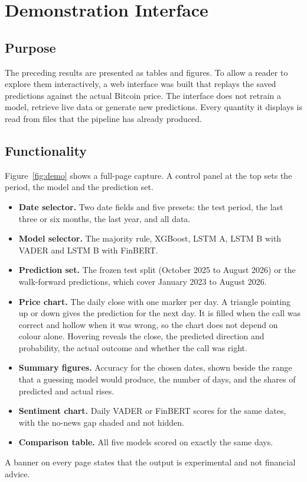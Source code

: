\section{Demonstration Interface}
\label{ch:demo}
\subsection{Purpose}
The preceding results are presented as tables and figures. To allow a reader to explore them interactively, a web interface was built that replays the saved predictions against the actual Bitcoin price. The interface does not retrain a model, retrieve live data or generate new predictions. Every quantity it displays is read from files that the pipeline has already produced.

\subsection{Functionality}
Figure~\ref{fig:demo} shows a full-page capture. A control panel at the top sets the period, the model and the prediction set.
\begin{itemize}
\item \textbf{Date selector.} Two date fields and five presets: the test period, the last three or six months, the last year, and all data.
\item \textbf{Model selector.} The majority rule, XGBoost, LSTM A, LSTM B with VADER and LSTM B with FinBERT.
\item \textbf{Prediction set.} The frozen test split (October 2025 to August 2026) or the walk-forward predictions, which cover January 2023 to August 2026.
\item \textbf{Price chart.} The daily close with one marker per day. A triangle pointing up or down gives the prediction for the next day. It is filled when the call was correct and hollow when it was wrong, so the chart does not depend on colour alone. Hovering reveals the close, the predicted direction and probability, the actual outcome and whether the call was right.
\item \textbf{Summary figures.} Accuracy for the chosen dates, shown beside the range that a guessing model would produce, the number of days, and the shares of predicted and actual rises.
\item \textbf{Sentiment chart.} Daily VADER or FinBERT scores for the same dates, with the no-news gap shaded and not hidden.
\item \textbf{Comparison table.} All five models scored on exactly the same days.
\end{itemize}
A banner on every page states that the output is experimental and not financial advice.

